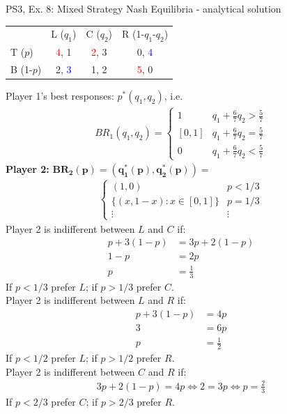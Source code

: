 \begin{frame}{PS3, Ex. 8: Mixed Strategy Nash Equilibria - analytical solution}
  \begin{multicols}{2}
    \begin{table}
      \begin{tabular}{l|c|c|c|}
          \multicolumn{1}{c}{}  & \multicolumn{1}{c}{L ($q_1$)} & \multicolumn{1}{c}{C ($q_2$)} & \multicolumn{1}{c}{R (1-$q_1$-$q_2$)} \\\cline{2-4}
          T ($p$)   & \textcolor{red}{4}, 1 & \textcolor{red}{2}, 3 & 0, \textcolor{blue}{4} \\\cline{2-4}
          B (1-$p$) & 2, \textcolor{blue}{3} & 1, 2 & \textcolor{red}{5}, 0 \\\cline{2-4}
      \end{tabular}
    \end{table}
    Player 1's best responses: $p^{*}(q_1,q_2)$, i.e.
    \begin{align*}
      BR_1(q_1,q_2)=
      \left\{ \begin{array}{ll}
          1                 & q_1 + \frac{6}{7}q_2 > \frac{5}{7}\\
          \left[0,1\right]  & q_1 + \frac{6}{7}q_2 = \frac{5}{7}\\
          0                 & q_1 + \frac{6}{7}q_2 < \frac{5}{7}
      \end{array}\right.
    \end{align*}
    \textbf{Player 2:} $\bm{BR_2(p)=\left(q_1^{*}(p),q_2^{*}(p)\right)}=$
    \begin{align*}
      \left\{ \begin{array}{ll}
          (1,0)                 & p < 1/3 \\
          \{(x,1-x):x\in[0,1]\} & p = 1/3 \\
          \vdots                & \vdots
      \end{array}\right.
    \end{align*}
  \vfill\null \columnbreak
    Player 2 is indifferent between $L$ and $C$ if:
    \begin{align*}
      p+3(1-p)&= 3p + 2(1-p) \\
      1-p     &= 2p \\
      p       &= \frac{1}{3}
    \end{align*}
    If $p<1/3$ prefer $L$; if $p>1/3$ prefer $C$.\\\medskip
    Player 2 is indifferent between $L$ and $R$ if:
    \begin{align*}
      p+3(1-p)&= 4p \\
      3       &= 6p \\
      p       &= \frac{1}{2}
    \end{align*}
    If $p<1/2$ prefer $L$; if $p>1/2$ prefer $R$.\\\medskip
    Player 2 is indifferent between $C$ and $R$ if:
    \begin{align*}
      3p+2(1-p) = 4p \Leftrightarrow 2 = 3p \Leftrightarrow p = \frac{2}{3}
    \end{align*}
    If $p<2/3$ prefer $C$; if $p>2/3$ prefer $R$.\\\medskip
  \vfill\null
  \end{multicols}
\end{frame}

